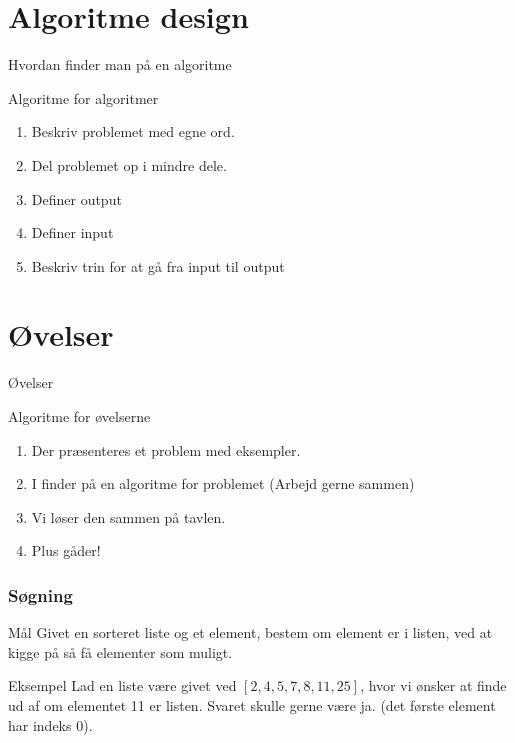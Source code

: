 \documentclass[12pt,t]{beamer}
\begin{document}
\section{Algoritme design}
    \begin{frame}[c]{Hvordan finder man på en algoritme}
        \begin{block}{Algoritme for algoritmer}
            \begin{enumerate}
                \item Beskriv problemet med egne ord. \pause
                \item Del problemet op i mindre dele. \pause
                \item Definer output \pause
                \item Definer input \pause
                \item Beskriv trin for at gå fra input til output
            \end{enumerate}
        \end{block}
    \end{frame}

    \section{Øvelser}
            \begin{frame}[t]{Øvelser}
                \begin{block}{Algoritme for øvelserne}
                    \begin{enumerate}
                        \item Der præsenteres et problem med eksempler. \pause
                        \item I finder på en algoritme for problemet
                              (Arbejd gerne sammen) \pause
                        \item Vi løser den sammen på tavlen. \pause
                        \item Plus gåder!
                    \end{enumerate}
                \end{block}
            \end{frame}

        \begin{frame}
          \frametitle{Søgning}
          \begin{block}{Mål}
          Givet en sorteret liste og et element, bestem om element er i listen,
          ved at kigge på så få elementer som muligt.
          \end{block}
          \pause

          \begin{exampleblock}{Eksempel}
          Lad en liste være givet ved $[2, 4, 5, 7, 8, 11, 25]$, hvor vi ønsker at
          finde ud af om elementet 11 er listen. Svaret skulle gerne være ja.
          (det første element har indeks 0).
          \end{exampleblock}
        \end{frame}
\end{document}
